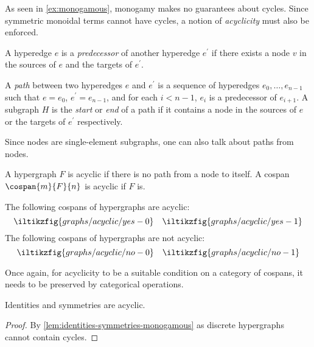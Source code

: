 As seen in \cref{ex:monogamous}, monogamy makes no guarantees about cycles.
Since symmetric monoidal terms cannot have cycles, a notion of \emph{acyclicity}
must also be enforced.

\begin{definition}
    A hyperedge \(e\) is a \emph{predecessor} of another hyperedge \(e^\prime\)
    if there exists a node \(v\) in the sources of \(e\) and the targets of
    \(e^\prime\).
\end{definition}

\begin{definition}
    A \emph{path} between two hyperedges \(e\) and \(e^\prime\) is a sequence of
    hyperedges \(e_0, \dots, e_{n-1}\) such that \(e = e_0\),
    \(e^\prime = e_{n-1}\), and for each \(i < n-1\), \(e_i\) is a predecessor
    of \(e_{i+1}\).
    A subgraph \(H\) is the \emph{start} or \emph{end} of a path if it contains
    a node in the sources of \(e\) or the targets of \(e^\prime\) respectively.
\end{definition}

Since nodes are single-element subgraphs, one can also talk about paths from
nodes.

\begin{definition}
    A hypergraph \(F\) is acyclic if there is no path from a node to itself.
    A cospan \(\cospan{m}{F}{n}\) is acyclic if \(F\) is.
\end{definition}

\begin{example}\label{ex:acyclic}
    The following cospans of hypergraphs are acyclic:
    \[
        \iltikzfig{graphs/acyclic/yes-0}
        \quad
        \iltikzfig{graphs/acyclic/yes-1}
    \]
    The following cospans of hypergraphs are not acyclic:
    \[
        \iltikzfig{graphs/acyclic/no-0}
        \quad
        \iltikzfig{graphs/acyclic/no-1}
    \]
\end{example}

Once again, for acyclicity to be a suitable condition on a category of cospans,
it needs to be preserved by categorical operations.

\begin{lemma}\label{lem:identities-symmetries-monogamous-acyclic}
    Identities and symmetries are acyclic.
\end{lemma}
\begin{proof}
    By \cref{lem:identities-symmetries-monogamous} as discrete
    hypergraphs cannot contain cycles.
\end{proof}

